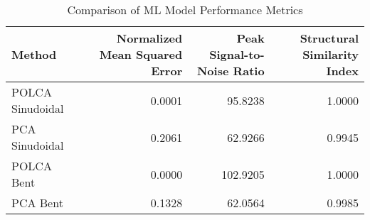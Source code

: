 \begin{table}[htbp]
\caption{Comparison of ML Model Performance Metrics}
\label{tab:model_comparison}
\begin{tabular}{lrrr}
\toprule
Method & Normalized Mean Squared Error & Peak Signal-to-Noise Ratio & Structural Similarity Index \\
\midrule
POLCA Sinudoidal & 0.0001 & 95.8238 & 1.0000 \\
PCA Sinudoidal & 0.2061 & 62.9266 & 0.9945 \\
POLCA Bent & 0.0000 & 102.9205 & 1.0000 \\
PCA Bent & 0.1328 & 62.0564 & 0.9985 \\
\bottomrule
\end{tabular}
\end{table}
